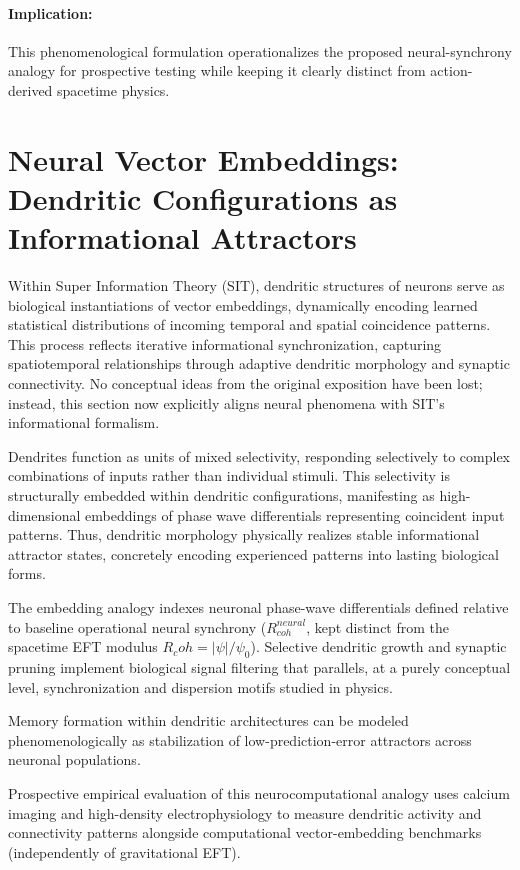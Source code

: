 \documentclass[american,11pt,letterpaper]{article}
\newcommand{\Rcoh}{R_{\mathrm{coh}}}
\def\mathrm#1{#1}%
\def\Rcoh{R_coh}%
\begin{document}
\paragraph{Implication:}
This phenomenological formulation operationalizes the proposed neural-synchrony analogy for prospective testing while keeping it clearly distinct from action-derived spacetime physics.

\section{Neural Vector Embeddings: Dendritic Configurations as Informational Attractors}

Within Super Information Theory (SIT), dendritic structures of neurons serve as biological instantiations of vector embeddings, dynamically encoding learned statistical distributions of incoming temporal and spatial coincidence patterns. This process reflects iterative informational synchronization, capturing spatiotemporal relationships through adaptive dendritic morphology and synaptic connectivity. No conceptual ideas from the original exposition have been lost; instead, this section now explicitly aligns neural phenomena with SIT's informational formalism.

Dendrites function as units of mixed selectivity, responding selectively to complex combinations of inputs rather than individual stimuli. This selectivity is structurally embedded within dendritic configurations, manifesting as high-dimensional embeddings of phase wave differentials representing coincident input patterns. Thus, dendritic morphology physically realizes stable informational attractor states, concretely encoding experienced patterns into lasting biological forms.

The embedding analogy indexes neuronal phase-wave differentials defined relative to baseline operational neural synchrony ($R_{\mathrm{coh}}^{\mathrm{neural}}$, kept distinct from the spacetime EFT modulus $\Rcoh = |\psi|/\psi_0$). Selective dendritic growth and synaptic pruning implement biological signal filtering that parallels, at a purely conceptual level, synchronization and dispersion motifs studied in physics.

Memory formation within dendritic architectures can be modeled phenomenologically as stabilization of low-prediction-error attractors across neuronal populations.

Prospective empirical evaluation of this neurocomputational analogy uses calcium imaging and high-density electrophysiology to measure dendritic activity and connectivity patterns alongside computational vector-embedding benchmarks (independently of gravitational EFT).
\end{document}
